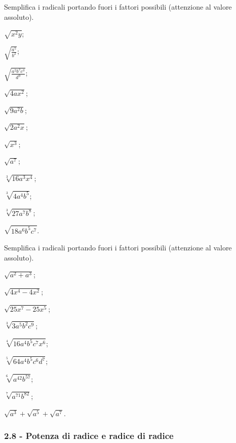 \begin{esercizio}[\Ast]
 \label{ese:2.44}
Semplifica i radicali portando fuori i fattori possibili (attenzione al valore assoluto).
 \begin{multicols}{3}
 \begin{enumeratea}
 \item $\sqrt{x^2y}$;
 \item $\sqrt{\frac{a^5}{b^2}}$;
 \item $\sqrt{\frac{a^2b^3c^3}{d^9}}$;
 \item $\sqrt{4ax^2}$;
 \item $\sqrt{9a^2b}$;
 \item $\sqrt{2a^2x}$;
 \item $\sqrt{x^3}$;
 \item $\sqrt{a^7}$;
 \item $\sqrt[3]{16a^3x^4}$;
 \item $\sqrt[3]{4a^4b^5}$;
 \item $\sqrt[3]{27a^7b^8}$;
 \item $\sqrt{18a^6b^5c^7}$.
 \end{enumeratea}
 \end{multicols}
\end{esercizio}
\newpage
\begin{esercizio}[\Ast]
 \label{ese:2.45}
Semplifica i radicali portando fuori i fattori possibili (attenzione al valore assoluto).
 \begin{multicols}{3}
 \begin{enumeratea}
 \item $\sqrt{a^2+a^3}$;
 \item $\sqrt{4x^4-4x^2}$;
 \item $\sqrt{25x^7-25x^5}$;
 \item $\sqrt[3]{3a^5b^2c^9}$;
 \item $\sqrt[4]{16a^4b^5c^7x^6}$;
 \item $\sqrt[5]{64a^4b^5c^6d^7}$;
 \item $\sqrt[6]{a^{42}b^{57}}$;
 \item $\sqrt[7]{a^{71}b^{82}}$;
 \item $\sqrt{a^3}+\sqrt{a^5}+\sqrt{a^7}$.
 \end{enumeratea}
 \end{multicols}
\end{esercizio}

\subsubsection*{2.8 - Potenza di radice e radice di radice}

